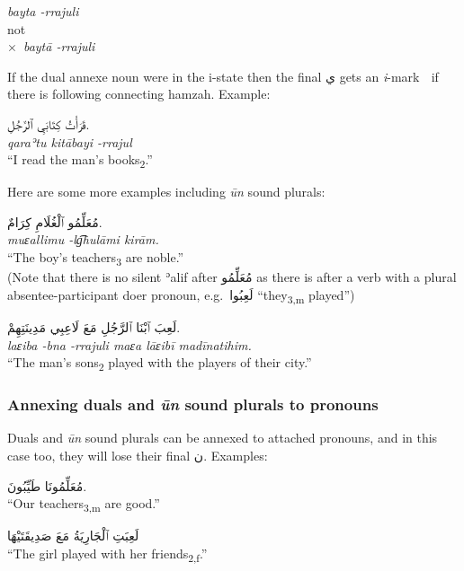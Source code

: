 \documentclass[
  10pt,
]{book}
\begin{document}
\emph{bayta -rrajuli}\\
not\\
\(\times\)~\emph{baytā -rrajuli}

If the dual annexe noun were in the i-state then the final \foreignlanguage{arabic}{ي} gets an \emph{i}-mark \emph{◌ِ} if there is following connecting hamzah. Example:

\foreignlanguage{arabic}{قَرَأْتُ کِتَابَيِ ٱلرَّجُلِ.}\\
\emph{qaraʾtu kitābayi -rrajul}\\
\enquote{I read the man's books\textsubscript{2}.}

Here are some more examples including \emph{ūn} sound plurals:

\foreignlanguage{arabic}{مُعَلِّمُو ٱلْغُلَامِ کِرَامٌ.}\\
\emph{muɛallimu -lg͡hulāmi kirām.}\\
\enquote{The boy's teachers\textsubscript{3} are noble.}\\
(Note that there is no silent ʾalif after \foreignlanguage{arabic}{مُعَلِّمُو} as there is after a verb with a plural absentee-participant doer pronoun, e.g.~\foreignlanguage{arabic}{لَعِبُوا} \enquote{they\textsubscript{3,m} played})

\foreignlanguage{arabic}{لَعِبَ ٱبْنَا ٱلرَّجُلِ مَعَ لَاعِبِي مَدِينَتِهِمْ.}\\
\emph{laɛiba -bna -rrajuli maɛa lāɛibī madīnatihim.}\\
\enquote{The man's sons\textsubscript{2} played with the players of their city.}

\subsubsection{\texorpdfstring{Annexing duals and \emph{ūn} sound plurals to pronouns}{Annexing duals and ūn sound plurals to pronouns}}\label{annexing-duals-and-un-sound-plurals-to-pronouns}

Duals and \emph{ūn} sound plurals can be annexed to attached pronouns, and in this case too, they will lose their final \foreignlanguage{arabic}{ن}. Examples:

\foreignlanguage{arabic}{مُعَلِّمُونَا طَيِّبُونَ.}\\
\enquote{Our teachers\textsubscript{3,m} are good.}

\foreignlanguage{arabic}{لَعِبَتِ ٱلْجَارِيَةُ مَعَ صَدِيقَتَيْهَا}\\
\enquote{The girl played with her friends\textsubscript{2,f}.}
\end{document}
